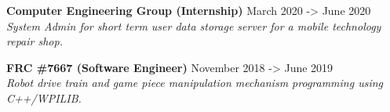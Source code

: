 \documentclass[10pt,letterpaper]{article}
\newcommand{\customtext}[2]{%
    {\fontsize{#1}{\dimexpr #1pt+2pt}\selectfont #2}%
}
\begin{document}
\begin{flushleft}
    {\customtext{12}{\textbf{Computer Engineering Group (Internship)}} \hfill \customtext{12}{March 2020 -> June 2020}} \\
    \customtext{10}{\textit{System Admin for short term user data storage server for a mobile technology repair shop.}}
    \vspace{14pt}

    {\customtext{12}{\textbf{FRC \#7667 (Software Engineer)}} \hfill \customtext{12}{November 2018 -> June 2019}} \\
    \customtext{10}{\textit{Robot drive train and game piece manipulation mechanism programming using C++/WPILIB.}}
    \vspace{14pt}

\end{flushleft}
\end{document}
